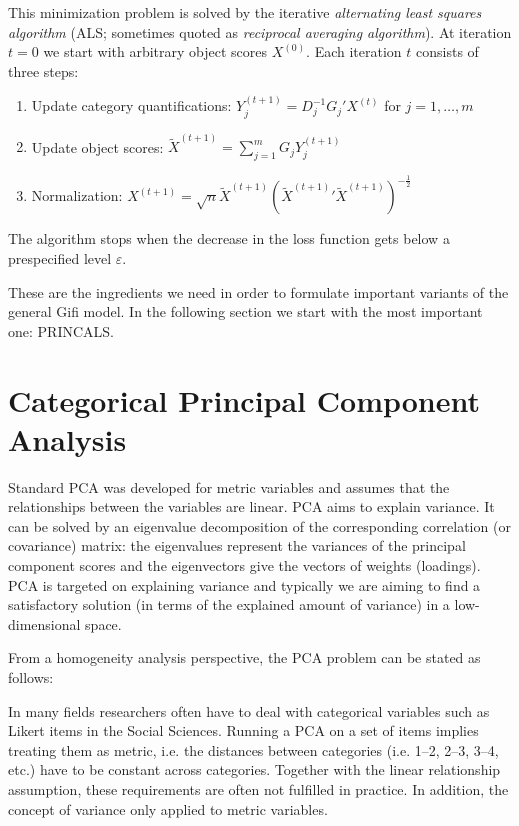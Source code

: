 \documentclass[10pt,nojss,nofooter,fleqn]{jss}\usepackage[]{graphicx}\usepackage[]{color}
\begin{document}
This minimization problem is solved by the iterative \emph{alternating least squares algorithm} (ALS; sometimes quoted as \emph{reciprocal averaging algorithm}). At iteration $t=0$ we start with arbitrary object scores $X^{(0)}$. Each iteration $t$ consists of three steps:
\begin{enumerate}
\item Update category quantifications: $Y_j^{(t+1)}=D_j^{-1}G_j'X^{(t)}$ for $j=1,\ldots,m$
\item Update object scores: $\tilde X^{(t+1)}=\sum_{j=1}^m G_j^{}Y_j^{(t+1)}$
\item Normalization: $X^{(t+1)}= \sqrt{n}\tilde X^{(t+1)}\left(\tilde X^{(t+1)}{'}\tilde X^{(t+1)}\right)^{-\frac{1}{2}}$
\end{enumerate}
The algorithm stops when the decrease in the loss function gets below a prespecified level $\varepsilon$. 

These are the ingredients we need in order to formulate important variants of the general Gifi model. 
In the following section we start with the most important one: PRINCALS.

\section{Categorical Principal Component Analysis}
\label{sec:princals}
Standard PCA was developed for metric variables and assumes that the relationships between the variables are linear. PCA aims to 
explain variance. It can be solved by an eigenvalue decomposition of the corresponding correlation (or covariance) matrix: the eigenvalues represent the variances of the principal component scores and the eigenvectors give the vectors of weights (loadings). PCA is targeted on explaining variance and typically we are aiming to find a satisfactory solution (in terms of the explained amount of variance) in a low-dimensional space. 

From a homogeneity analysis perspective, the PCA problem can be stated as follows: 


In many fields researchers often have to deal with categorical variables such as Likert items in the Social Sciences. Running a PCA on a set of items implies treating them as metric, i.e. the distances between categories (i.e. 1--2, 2--3, 3--4, etc.) have to be constant across categories. Together with the linear relationship assumption, these requirements are often not fulfilled in practice. 
In addition, the concept of variance only applied to metric variables. 
\end{document}
